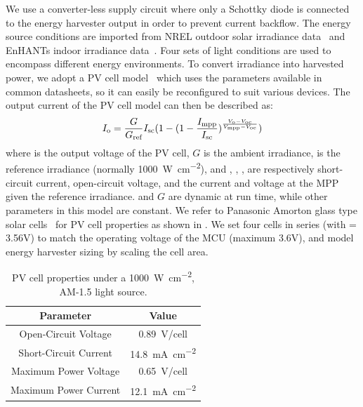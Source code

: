 We use a converter-less supply circuit where only a Schottky diode is connected to the energy harvester output in order to prevent current backflow. 
The energy source conditions are imported from NREL outdoor solar irradiance data~\cite{stoffel1981nrel} and EnHANTs indoor irradiance data~\cite{6244798}. 
Four sets of light conditions are used to encompass different energy environments. 
To convert irradiance into harvested power, we adopt a PV cell model~\cite{en9050326} which uses the parameters available in common datasheets, so it can easily be reconfigured to suit various devices. 
The output current  of the PV cell model can then be described as:
\begin{equation} \label{eq:pvcell}
    I_{\text{o}} = \frac{G}{G_{\text{ref}}} I_{\text{sc}} (1 - (1 - \frac{I_{\text{mpp}}}{I_{\text{sc}}}) ^ {\frac{V_{\text{o}}-V_{\text{oc}}}{V_{\text{mpp}} - V_{\text{oc}}}})
\end{equation}
where  is the output voltage of the PV cell, $G$ is the ambient irradiance,  is the reference irradiance (normally \SI{1000}{\watt\per\square\centi\meter}), and , , ,  are respectively short-circuit current, open-circuit voltage, and the current and voltage at the MPP given the reference irradiance. 
 and $G$ are dynamic at run time, while other parameters in this model are constant. 
We refer to Panasonic Amorton glass type solar cells~\cite{solarcell} for PV cell properties as shown in . 
We set four cells in series (with  = 3.56V) to match the operating voltage of the MCU (maximum 3.6V), and model energy harvester sizing by scaling the cell area. 



\begin{table}
    \renewcommand{\arraystretch}{1.2}
    \centering
    \begin{tabular}{|c|c|}
    \hline
    \textbf{Parameter} & \textbf{Value}\\
    \hline
    Open-Circuit Voltage & \SI{0.89}{\volt}/cell\\
    Short-Circuit Current & \SI{14.8}{\milli\ampere\per\square\centi\meter}\\
    Maximum Power Voltage & \SI{0.65}{\volt}/cell\\ 
    Maximum Power Current & \SI{12.1}{\milli\ampere\per\square\centi\meter}\\
    \hline
    \end{tabular}
    \caption{PV cell properties under a \SI{1000}{\watt\per\square\centi\meter}, AM-1.5 light source.}
    \label{tab:pvcell}
\end{table}

